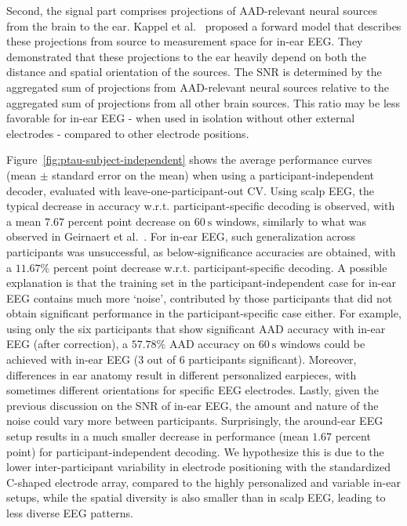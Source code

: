 \documentclass[fleqn,10pt]{wlscirep}
\begin{document}
	Second, the signal part comprises projections of AAD-relevant neural sources from the brain to the ear. Kappel et al.~\cite{kappel2019ear} proposed a forward model that describes these projections from source to measurement space for in-ear EEG. They demonstrated that these projections to the ear heavily depend on both the distance and spatial orientation of the sources. The SNR is determined by the aggregated sum of projections from AAD-relevant neural sources relative to the aggregated sum of projections from all other brain sources. This ratio may be less favorable for in-ear EEG - when used in isolation without other external electrodes - compared to other electrode positions.
	
	Figure~\ref{fig:ptau-subject-independent} shows the average performance curves (mean $\pm$ standard error on the mean) when using a participant-independent decoder, evaluated with leave-one-participant-out CV. Using scalp EEG, the typical decrease in accuracy w.r.t. participant-specific decoding is observed, with a mean $7.67$ percent point decrease on $\SI{60}{\second}$ windows, similarly to what was observed in Geirnaert et al.~\cite{geirnaert2021unsupervised}. For in-ear EEG, such generalization across participants was unsuccessful, as below-significance accuracies are obtained, with a $11.67\%$ percent point decrease w.r.t. participant-specific decoding. A possible explanation is that the training set in the participant-independent case for in-ear EEG contains much more `noise', contributed by those participants that did not obtain significant performance in the participant-specific case either. For example, using only the six participants that show significant AAD accuracy with in-ear EEG (after correction), a $57.78\%$ AAD accuracy on $\SI{60}{\second}$ windows could be achieved with in-ear EEG (3 out of 6 participants significant). Moreover, differences in ear anatomy result in different personalized earpieces, with sometimes different orientations for specific EEG electrodes. Lastly, given the previous discussion on the SNR of in-ear EEG, the amount and nature of the noise could vary more between participants. Surprisingly, the around-ear EEG setup results in a much smaller decrease in performance (mean $1.67$ percent point) for participant-independent decoding. We hypothesize this is due to the lower inter-participant variability in electrode positioning with the standardized C-shaped electrode array, compared to the highly personalized and variable in-ear setups, while the spatial diversity is also smaller than in scalp EEG, leading to less diverse EEG patterns.
	
\end{document}
